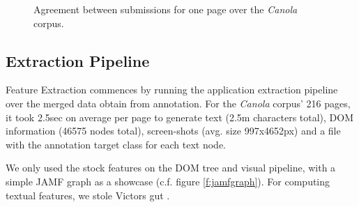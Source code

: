 \begin{figure}[h]
\centering
{}
\label{f:merge}
\caption{Agreement between submissions for one page over the \textit{Canola} corpus.}
\end{figure}


\subsection{Extraction Pipeline}

Feature Extraction commences by running the {\KrdWrd} application extraction pipeline over the merged data obtain from annotation. 
For the \textit{Canola} corpus' 216 pages, it took 2.5sec on average per page to generate text (2.5m characters total), DOM information (46575 nodes total), screen-shots (avg. size 997x4652px) and a file with the annotation target class for each text node.

We only used the stock {\KrdWrd} features on the DOM tree and visual pipeline, with a simple JAMF graph as a showcase (c.f. figure \ref{f:jamfgraph}).
For computing textual features, we stole Victors gut \cite{spoustamarekpecina2008}.

